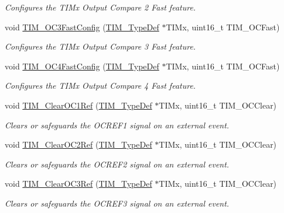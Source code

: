 \begin{DoxyCompactItemize}
\begin{DoxyCompactList}\small\item\em Configures the T\+I\+Mx Output Compare 2 Fast feature. \end{DoxyCompactList}\item 
void \hyperlink{group___t_i_m___group2_gab2f3698e6e56bd9b0a4be7056ba789e1}{T\+I\+M\+\_\+\+O\+C3\+Fast\+Config} (\hyperlink{struct_t_i_m___type_def}{T\+I\+M\+\_\+\+Type\+Def} $\ast$T\+I\+Mx, uint16\+\_\+t T\+I\+M\+\_\+\+O\+C\+Fast)
\begin{DoxyCompactList}\small\item\em Configures the T\+I\+Mx Output Compare 3 Fast feature. \end{DoxyCompactList}\item 
void \hyperlink{group___t_i_m___group2_ga58279a04e8ea5333f1079d3cce8dde12}{T\+I\+M\+\_\+\+O\+C4\+Fast\+Config} (\hyperlink{struct_t_i_m___type_def}{T\+I\+M\+\_\+\+Type\+Def} $\ast$T\+I\+Mx, uint16\+\_\+t T\+I\+M\+\_\+\+O\+C\+Fast)
\begin{DoxyCompactList}\small\item\em Configures the T\+I\+Mx Output Compare 4 Fast feature. \end{DoxyCompactList}\item 
void \hyperlink{group___t_i_m___group2_ga34e926cd8a99cfcc7480b2d6de5118b6}{T\+I\+M\+\_\+\+Clear\+O\+C1\+Ref} (\hyperlink{struct_t_i_m___type_def}{T\+I\+M\+\_\+\+Type\+Def} $\ast$T\+I\+Mx, uint16\+\_\+t T\+I\+M\+\_\+\+O\+C\+Clear)
\begin{DoxyCompactList}\small\item\em Clears or safeguards the O\+C\+R\+E\+F1 signal on an external event. \end{DoxyCompactList}\item 
void \hyperlink{group___t_i_m___group2_gac474ebc815d24c8a589969e0c68b27b0}{T\+I\+M\+\_\+\+Clear\+O\+C2\+Ref} (\hyperlink{struct_t_i_m___type_def}{T\+I\+M\+\_\+\+Type\+Def} $\ast$T\+I\+Mx, uint16\+\_\+t T\+I\+M\+\_\+\+O\+C\+Clear)
\begin{DoxyCompactList}\small\item\em Clears or safeguards the O\+C\+R\+E\+F2 signal on an external event. \end{DoxyCompactList}\item 
void \hyperlink{group___t_i_m___group2_ga0bd9476a14bd346c319945ec4fa2bc67}{T\+I\+M\+\_\+\+Clear\+O\+C3\+Ref} (\hyperlink{struct_t_i_m___type_def}{T\+I\+M\+\_\+\+Type\+Def} $\ast$T\+I\+Mx, uint16\+\_\+t T\+I\+M\+\_\+\+O\+C\+Clear)
\begin{DoxyCompactList}\small\item\em Clears or safeguards the O\+C\+R\+E\+F3 signal on an external event. \end{DoxyCompactList}\item 

\end{DoxyCompactItemize}
